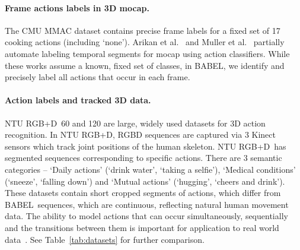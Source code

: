 \documentclass[final]{cvpr}
\def\babel{BABEL}
\def\ntu{NTU RGB+D}
\begin{document}
\noindent
\paragraph{Frame actions labels in 3D mocap.}
The CMU MMAC dataset \cite{DBLP:conf/cvpr/SpriggsTH09} 
contains precise frame labels for a fixed set of 17 cooking actions (including `none'). 
Arikan et al.~\cite{DBLP:journals/tog/ArikanFO03} and Muller et al.~\cite{DBLP:conf/sca/MullerBS09} partially automate labeling temporal segments for mocap using action classifiers. 
While these works assume a known, fixed set of classes, in \babel, we identify and precisely label all actions that occur in each frame. 

\noindent
\paragraph{Action labels and tracked 3D data.} 
\ntu~60 \cite{DBLP:conf/cvpr/ShahroudyLNW16} and 120 \cite{DBLP:journals/pami/LiuSPWDK20} are large, widely used datasets for 3D action recognition. 
In \ntu, RGBD sequences are captured via 3 Kinect sensors which track joint positions of the human skeleton. 
\ntu~has segmented sequences corresponding to specific actions. There are 3 semantic categories -- `Daily actions' (`drink water', `taking a selfie'), `Medical conditions' (`sneeze', `falling down') and `Mutual actions' (`hugging', `cheers and drink'). 
These datasets contain short cropped segments of actions, which differ from \babel~sequences, which are continuous, reflecting natural human movement data. 
The ability to model actions that can occur simultaneously, sequentially and the transitions between them is important for application to real world data~\cite{DBLP:conf/mir/SedmidubskyEZ19}. 
See Table~\ref{tab:datasets} for further comparison. 

\noindent
\end{document}
